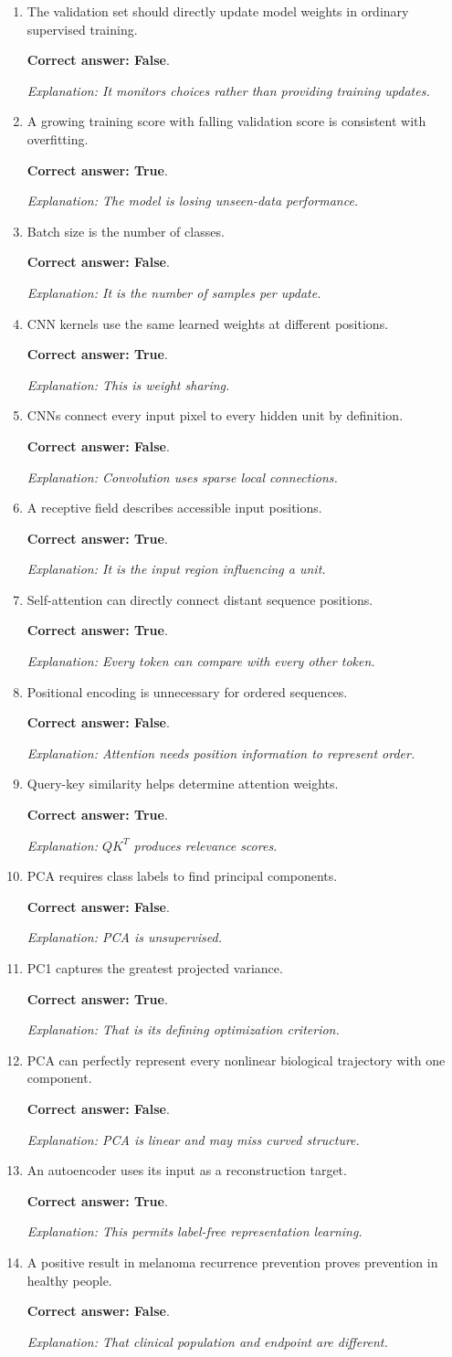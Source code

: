 \documentclass[10pt,a4paper]{article}
\newcommand{\ans}[1]{\par\textbf{Correct answer: #1}}
\newcommand{\expn}[1]{\par\textit{Explanation: #1}}
\begin{document}
\begin{enumerate}[label=\textbf{\arabic*.},start=61,itemsep=3pt]
\item The validation set should directly update model weights in ordinary supervised training. \ans{False}. \expn{It monitors choices rather than providing training updates.}
\item A growing training score with falling validation score is consistent with overfitting. \ans{True}. \expn{The model is losing unseen-data performance.}
\item Batch size is the number of classes. \ans{False}. \expn{It is the number of samples per update.}
\item CNN kernels use the same learned weights at different positions. \ans{True}. \expn{This is weight sharing.}
\item CNNs connect every input pixel to every hidden unit by definition. \ans{False}. \expn{Convolution uses sparse local connections.}
\item A receptive field describes accessible input positions. \ans{True}. \expn{It is the input region influencing a unit.}
\item Self-attention can directly connect distant sequence positions. \ans{True}. \expn{Every token can compare with every other token.}
\item Positional encoding is unnecessary for ordered sequences. \ans{False}. \expn{Attention needs position information to represent order.}
\item Query-key similarity helps determine attention weights. \ans{True}. \expn{$QK^T$ produces relevance scores.}
\item PCA requires class labels to find principal components. \ans{False}. \expn{PCA is unsupervised.}
\item PC1 captures the greatest projected variance. \ans{True}. \expn{That is its defining optimization criterion.}
\item PCA can perfectly represent every nonlinear biological trajectory with one component. \ans{False}. \expn{PCA is linear and may miss curved structure.}
\item An autoencoder uses its input as a reconstruction target. \ans{True}. \expn{This permits label-free representation learning.}
\item A positive result in melanoma recurrence prevention proves prevention in healthy people. \ans{False}. \expn{That clinical population and endpoint are different.}
\end{enumerate}
\end{document}
